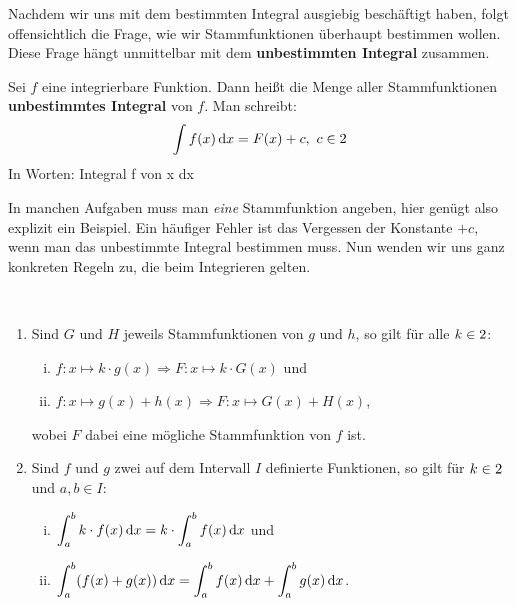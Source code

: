 \documentclass[ngerman, 12pt]{nssheetxea}
\begin{document}
Nachdem wir uns mit dem bestimmten Integral ausgiebig beschäftigt haben, folgt offensichtlich die Frage, wie wir Stammfunktionen überhaupt bestimmen wollen. Diese Frage hängt unmittelbar mit dem \textbf{unbestimmten Integral} zusammen. 

\begin{definition}
Sei $f$ eine integrierbare Funktion. Dann heißt die Menge aller Stammfunktionen \textbf{unbestimmtes Integral} von $f$. Man schreibt:
\[ \int f(x) \diff x = F(x)+c, \ c \in \R \]
In Worten: \glqq Integral f von x dx\grqq
{} 
\end{definition}
In manchen Aufgaben muss man \textit{eine} Stammfunktion angeben, hier genügt also explizit ein Beispiel. Ein häufiger Fehler ist das Vergessen der Konstante $+c$, wenn man das unbestimmte Integral bestimmen muss. Nun wenden wir uns ganz konkreten Regeln zu, die beim Integrieren gelten.

\begin{theorem} \
\begin{enumerate}
\item Sind $G$ und $H$ jeweils Stammfunktionen von $g$ und $h$, so gilt für alle $k\in 2$:
\begin{enumerate}[i)]
	\item $f:x \mapsto k \cdot g(x) \Rightarrow F:x\mapsto k \cdot G(x)$ und
	\item $f:x\mapsto g(x)+h(x) \Rightarrow F:x \mapsto G(x)+H(x)$, 
\end{enumerate}
wobei $F$ dabei eine mögliche Stammfunktion von $f$ ist.
\item Sind $f$ und $g$ zwei auf dem Intervall $I$ definierte Funktionen, so gilt für $k\in 2$ und $a,b \in I$:
	\begin{enumerate}[i)]
	\item $\displaystyle \int_a^b k\cdot f(x) \mathop{}\!\mathrm{d} x = k \cdot \int_a^bf(x) \mathop{}\!\mathrm{d} x$ und
	\item $\displaystyle \int_a^b(f(x)+g(x))\mathop{}\!\mathrm{d} x = \int_a^bf(x)\mathop{}\!\mathrm{d} x + \int_a^b g(x) \mathop{}\!\mathrm{d} x$.
	\end{enumerate}
\end{enumerate}
\label{Satz:Int_Regeln}
\end{theorem}
\end{document}
